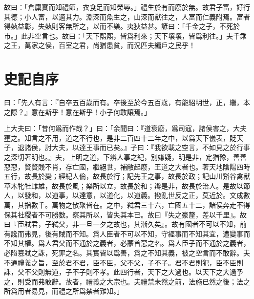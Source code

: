 故曰：「倉廩實而知禮節，衣食足而知榮辱。」禮生於有而廢於無。故君子富，好行其德；小人富，以適其力。淵深而魚生之，山深而獸往之，人富而仁義附焉。富者得埶益彰，失埶則客無所之，以而不樂。夷狄益甚。諺曰：「千金之子，不死於市。」此非空言也。故曰：「天下熙熙，皆爲利來；天下壤壤，皆爲利往。」夫千乘之王，萬家之侯，百室之君，尚猶患貧，而況匹夫編戶之民乎！

\theendnotes

\section[太史公自序\quad{\small 史記}]{{\normalsize 史記}\quad {}自序}
曰：「先人有言：『自卒五百歲而有。卒後至於今五百歲，有能紹明世，正，繼，本之際？』意在斯乎！意在斯乎！小子何敢讓焉。」

上大夫曰：「昔何爲而作哉？」曰：「余聞曰：『道衰廢，爲司寇，諸侯害之，大夫壅之。知言之不用，道之不行也，是非二百四十二年之中，以爲天下儀表，貶天子，退諸侯，討大夫，以達王事而已矣。』子曰：『我欲載之空言，不如見之於行事之深切著明也。』夫，上明之道，下辨人事之紀，別嫌疑，明是非，定猶豫，善善惡惡，賢賢賤不肖，存亡國，繼絕世，補敝起廢，王道之大者也。著天地陰陽四時五行，故長於變；經紀人倫，故長於行；記先王之事，故長於政；記山川谿谷禽獸草木牝牡雌雄，故長於風；樂所以立，故長於和；辯是非，故長於治人。是故以節人，以發和，以道事，以達意，以道化，以道義。撥亂世反之正，莫近於。文成數萬，其指數千。萬物之散聚皆在。之中，弒君三十六，亡國五十二，諸侯奔走不得保其社稷者不可勝數。察其所以，皆失其本已。故曰『失之豪釐，差以千里』。故曰『臣弒君，子弒父，非一旦一夕之故也，其漸久矣』。故有國者不可以不知，前有讒而弗見，後有賊而不知。爲人臣者不可以不知，守經事而不知其宜，遭變事而不知其權。爲人君父而不通於之義者，必蒙首惡之名。爲人臣子而不通於之義者，必陷篡弒之誅，死罪之名。其實皆以爲善，爲之不知其義，被之空言而不敢辭。夫不通禮義之旨，至於君不君，臣不臣，父不父，子不子。君不君則犯，臣不臣則誅，父不父則無道，子不子則不孝。此四行者，天下之大過也。以天下之大過予之，則受而弗敢辭。故者，禮義之大宗也。夫禮禁未然之前，法施已然之後；法之所爲用者易見，而禮之所爲禁者難知。」

